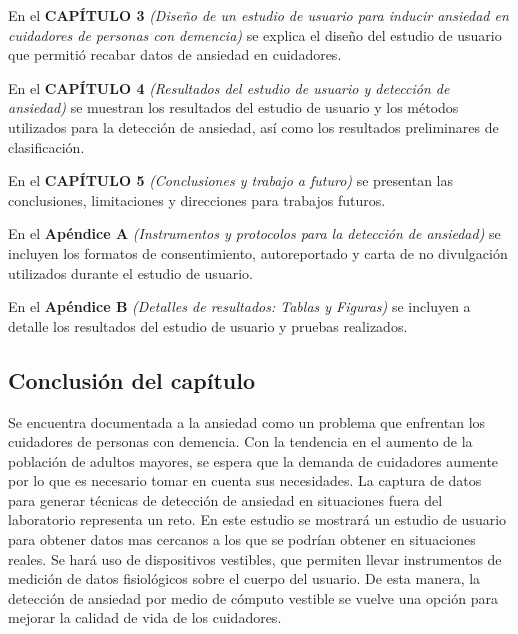	En el \textbf{CAP\'ITULO 3} \textit{(Dise\~no de un estudio de usuario para inducir ansiedad en cuidadores de personas con demencia)} se explica el dise\~no del estudio de usuario que permiti\'o recabar datos de ansiedad en cuidadores.

	En el \textbf{CAP\'ITULO 4} \textit{(Resultados del estudio de usuario y detecci\'on de ansiedad)} se muestran los resultados del estudio de usuario y los m\'etodos utilizados para la detecci\'on de ansiedad, as\'i como los resultados preliminares de clasificaci\'on.

	En el \textbf{CAP\'ITULO 5} \textit{(Conclusiones y trabajo a futuro)} se presentan las conclusiones, limitaciones y direcciones para trabajos futuros.

	En el \textbf{Ap\'endice A} \textit{(Instrumentos y protocolos para la detecci\'on de ansiedad)} se incluyen los formatos de consentimiento, autoreportado y carta de no divulgaci\'on utilizados durante el estudio de usuario.

	En el \textbf{Ap\'endice B} \textit{(Detalles de resultados: Tablas y Figuras)} se incluyen a detalle los resultados del estudio de usuario y pruebas realizados.


\subsection{Conclusi\'on del cap\'itulo}
	Se encuentra documentada a la ansiedad como un problema que enfrentan los cuidadores de personas con demencia. Con la tendencia en el aumento de la poblaci\'on de adultos mayores, se espera que la demanda de cuidadores aumente por lo que es necesario tomar en cuenta sus necesidades. La captura de datos para generar t\'ecnicas de detecci\'on de ansiedad en situaciones fuera del laboratorio representa un reto. En este estudio se mostrar\'a un estudio de usuario para obtener datos mas cercanos a los que se podr\'ian obtener en situaciones reales. Se har\'a uso de dispositivos vestibles, que permiten llevar instrumentos de medici\'on de datos fisiol\'ogicos sobre el cuerpo del usuario. De esta manera, la detecci\'on de ansiedad por medio de c\'omputo vestible se vuelve una opci\'on para mejorar la calidad de vida de los cuidadores.
\newpage
